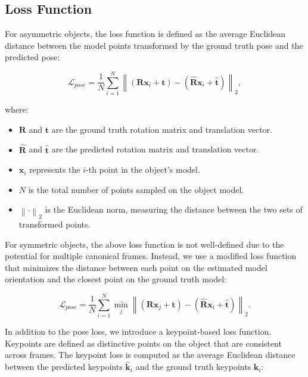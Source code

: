 \subsection{Loss Function}

For asymmetric objects, the loss function is defined as the average Euclidean distance between the model points transformed by the ground truth pose and the predicted pose:

\begin{equation}
\mathcal{L}_{pose} = \frac{1}{N} \sum_{i=1}^{N} \left\| (\mathbf{R} \mathbf{x}_i + \mathbf{t}) - (\hat{\mathbf{R}} \mathbf{x}_i + \hat{\mathbf{t}}) \right\|_2,
\end{equation}

\noindent where:

\begin{itemize}
    \item $\mathbf{R}$ and $\mathbf{t}$ are the ground truth rotation matrix and translation vector.
    \item $\hat{\mathbf{R}}$ and $\hat{\mathbf{t}}$ are the predicted rotation matrix and translation vector.
    \item $\mathbf{x}_i$ represents the $i$-th point in the object's model.
    \item $N$ is the total number of points sampled on the object model.
    \item $\left\| \cdot \right\|_2$ is the Euclidean norm, measuring the distance between the two sets of transformed points.
\end{itemize}

\noindent For symmetric objects, the above loss function is not well-defined due to the potential for multiple canonical frames. Instead, we use a modified loss function that minimizes the distance between each point on the estimated model orientation and the closest point on the ground truth model:

\begin{equation}
\mathcal{L}_{pose} = \frac{1}{N} \sum_{i=1}^{N} \min_{j} \left\| (\mathbf{R} \mathbf{x}_j + \mathbf{t}) - (\hat{\mathbf{R}} \mathbf{x}_i + \hat{\mathbf{t}}) \right\|_2.
\end{equation}

\noindent In addition to the pose loss, we introduce a keypoint-based loss function. Keypoints are defined as distinctive points on the object that are consistent across frames. The keypoint loss is computed as the average Euclidean distance between the predicted keypoints $\hat{\mathbf{k}}_i$ and the ground truth keypoints $\mathbf{k}_i$:


